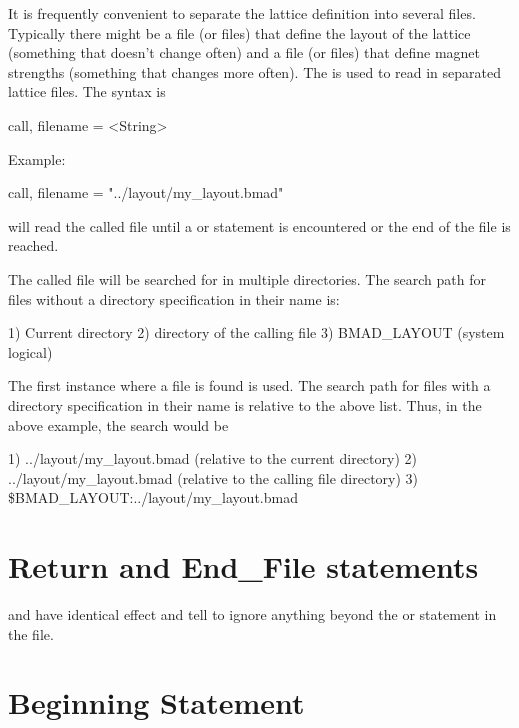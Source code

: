 It is frequently convenient to separate the lattice definition into
several files.  Typically there might be a file (or files) that define
the layout of the lattice (something that doesn't change often) and a
file (or files) that define magnet strengths (something that changes
more often).  The  is used to read in separated lattice
files. The syntax is
\begin{example}
  call, filename = <String>
\end{example}
Example:
\begin{example}
  call, filename = "../layout/my_layout.bmad"
\end{example}
\bmad will read the called file until a  or 
statement is encountered or the end of the file is reached.

The called file will be searched for in multiple directories.
The search path for files without a directory specification in their name is:
\begin{example}
	1) Current directory
	2) directory of the calling file
	3) BMAD_LAYOUT (system logical)
\end{example}
The first instance where a file is found is used.
The search path for files with a directory specification in their name
is relative to the above list. Thus, in the above example, the search
would be
\begin{example}
  1) ../layout/my_layout.bmad  (relative to the current directory)
  2) ../layout/my_layout.bmad  (relative to the calling file directory)
  3) \$BMAD_LAYOUT:../layout/my_layout.bmad 
\end{example}

\section{Return and End_File statements}

 and  have identical effect and tell \bmad to
ignore anything beyond the  or  statement in
the file.

\section{Beginning Statement}
\label{s:beginning}

